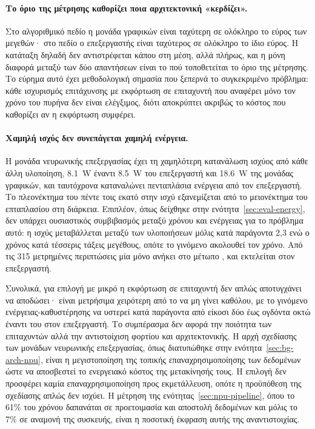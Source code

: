 \paragraph{Το όριο της μέτρησης καθορίζει ποια αρχιτεκτονική «κερδίζει».} Στο
αλγοριθμικό πεδίο η μονάδα γραφικών είναι ταχύτερη σε ολόκληρο το εύρος των
μεγεθών· στο πεδίο  ο επεξεργαστής είναι ταχύτερος σε ολόκληρο το
ίδιο εύρος. Η κατάταξη δηλαδή δεν αντιστρέφεται κάπου στη μέση, αλλά πλήρως, και
η μόνη διαφορά μεταξύ των δύο απαντήσεων είναι το πού τοποθετείται το όριο της
μέτρησης. Το εύρημα αυτό έχει μεθοδολογική σημασία που ξεπερνά το συγκεκριμένο
πρόβλημα: κάθε ισχυρισμός επιτάχυνσης με εκφόρτωση σε επιταχυντή που αναφέρει
μόνο τον χρόνο του πυρήνα δεν είναι ελέγξιμος, διότι αποκρύπτει ακριβώς το
κόστος που καθορίζει αν η εκφόρτωση συμφέρει.

\paragraph{Χαμηλή ισχύς δεν συνεπάγεται χαμηλή ενέργεια.} Η μονάδα νευρωνικής
επεξεργασίας έχει τη χαμηλότερη κατανάλωση ισχύος από κάθε άλλη υλοποίηση,
\qty{8.1}{\watt} έναντι \qty{8.5}{\watt} του επεξεργαστή και \qty{18.6}{\watt}
της μονάδας γραφικών, και ταυτόχρονα καταναλώνει πενταπλάσια ενέργεια από τον
επεξεργαστή. Το πλεονέκτημα του πέντε τοις εκατό στην ισχύ εξανεμίζεται από το
μειονέκτημα του επταπλασίου στη διάρκεια. Επιπλέον, όπως δείχθηκε στην
ενότητα~\ref{sec:eval-energy}, δεν υπάρχει ουσιαστικός συμβιβασμός μεταξύ χρόνου
και ενέργειας για το πρόβλημα αυτό: η ισχύς μεταβάλλεται μεταξύ των υλοποιήσεων
μόλις κατά παράγοντα 2,3 ενώ ο χρόνος κατά τέσσερις τάξεις μεγέθους, οπότε το
γινόμενο ακολουθεί τον χρόνο. Από τις 315 μετρημένες περιπτώσεις μία μόνο ανήκει
στο μέτωπο , και εκτελείται στον επεξεργαστή.

Συνολικά, για επιλογή  με μικρό  η εκφόρτωση σε επιταχυντή δεν
απλώς αποτυγχάνει να αποδώσει· είναι μετρήσιμα χειρότερη από το να μη γίνει
καθόλου, με το γινόμενο ενέργειας-καθυστέρησης να υστερεί κατά παράγοντα από
είκοσι δύο έως ογδόντα οκτώ έναντι του  στον επεξεργαστή. Το
συμπέρασμα δεν αφορά την ποιότητα των επιταχυντών αλλά την αντιστοίχιση φορτίου
και αρχιτεκτονικής. Η αρχή σχεδίασης των μονάδων νευρωνικής επεξεργασίας, όπως
διατυπώθηκε στην ενότητα~\ref{sec:bg-arch-npu}, είναι η μεγιστοποίηση της τοπικής
επαναχρησιμοποίησης των δεδομένων ώστε να αποσβεστεί το ενεργειακό κόστος της
μετακίνησής τους. Η επιλογή  δεν προσφέρει καμία επαναχρησιμοποίηση
προς εκμετάλλευση, οπότε η προϋπόθεση της σχεδίασης απλώς δεν ισχύει. Η μέτρηση
της ενότητας~\ref{sec:npu-pipeline}, όπου το 61\% του χρόνου δαπανάται σε
προετοιμασία και αποστολή δεδομένων και μόλις το 7\% σε αναμονή της συσκευής,
είναι η ποσοτική έκφραση αυτής της αναντιστοιχίας.


